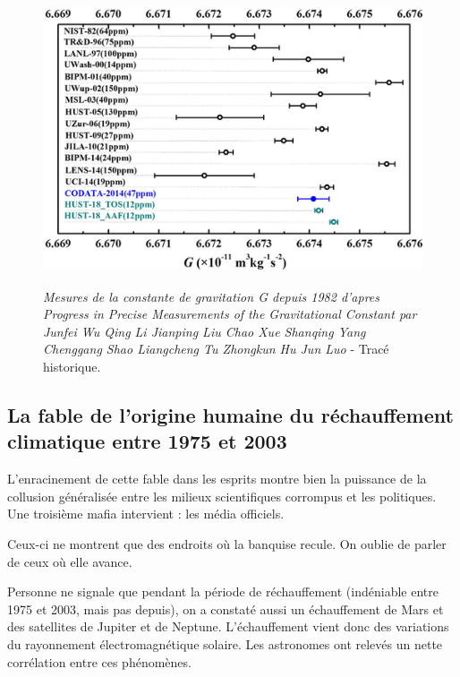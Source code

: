 \documentclass[a4paper,12pt]{article}
\begin{document}
\begin{figure}
\centering
\includegraphics[width=14.5cm,height=8.6cm]{./figures/ProgressinPreciseMeasurementsoftheGravitationalConstant.png}
\caption [Mesures de la constante de gravitation G depuis 1982]{\textit{Mesures de la constante de gravitation G depuis 1982 d'apres Progress in Precise Measurements of the Gravitational Constant \cite{Wu} par Junfei Wu  Qing Li  Jianping Liu  Chao Xue  Shanqing Yang  Chenggang Shao  Liangcheng Tu  Zhongkun Hu  Jun Luo} - Tracé historique.} 
\label{fig:8:figure8}
\end{figure}






\subsection {La fable de l'origine humaine du réchauffement climatique entre 1975 et 2003}

L’enracinement de cette fable dans les esprits montre bien la puissance de la collusion généralisée entre les milieux scientifiques corrompus et les politiques. Une troisième mafia intervient : les média officiels.

Ceux-ci ne montrent que des endroits où la banquise recule. On oublie de parler de ceux où elle avance.

Personne ne signale que pendant la période de réchauffement (indéniable entre 1975 et 2003, mais pas depuis), on a constaté aussi un échauffement de Mars et des satellites de Jupiter et de Neptune. L’échauffement vient donc des variations du rayonnement électromagnétique solaire. Les astronomes ont relevés un nette corrélation entre ces phénomènes.
\end{document}
